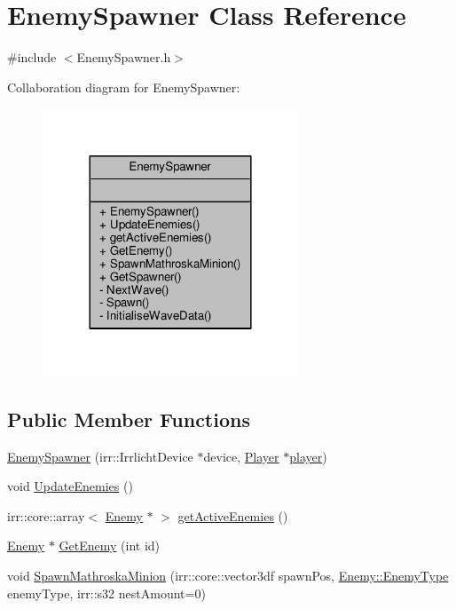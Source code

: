 \hypertarget{class_enemy_spawner}{\section{Enemy\-Spawner Class Reference}
\label{class_enemy_spawner}
}


{\ttfamily \#include $<$Enemy\-Spawner.\-h$>$}



Collaboration diagram for Enemy\-Spawner\-:
\nopagebreak
\begin{figure}[H]
\begin{center}
\leavevmode
\includegraphics[width=216pt]{class_enemy_spawner__coll__graph}
\end{center}
\end{figure}
\subsection*{Public Member Functions}
\begin{DoxyCompactItemize}
\item 
\hyperlink{class_enemy_spawner_a3553ec74e00d89f89f323b36cc9bf3f6}{Enemy\-Spawner} (irr\-::\-Irrlicht\-Device $\ast$device, \hyperlink{class_player}{Player} $\ast$\hyperlink{_enemy_8cpp_a96781128d3743da3d17e0fdd91afba7b}{player})
\item 
void \hyperlink{class_enemy_spawner_ab7717d2d42a40b943564629a85f0fabc}{Update\-Enemies} ()
\item 
irr\-::core\-::array$<$ \hyperlink{class_enemy}{Enemy} $\ast$ $>$ \hyperlink{class_enemy_spawner_ad83b7b7bfe4904e9addcad621d62295d}{get\-Active\-Enemies} ()
\item 
\hyperlink{class_enemy}{Enemy} $\ast$ \hyperlink{class_enemy_spawner_a42d5341193911135909c3df1a6271d3f}{Get\-Enemy} (int id)
\item 
void \hyperlink{class_enemy_spawner_ac664064f5f057837fde5c2e81daa2e6e}{Spawn\-Mathroska\-Minion} (irr\-::core\-::vector3df spawn\-Pos, \hyperlink{class_enemy_a98c2ee2c2081001de17a4bc9fa8da94f}{Enemy\-::\-Enemy\-Type} enemy\-Type, irr\-::s32 nest\-Amount=0)
\end{DoxyCompactItemize}
